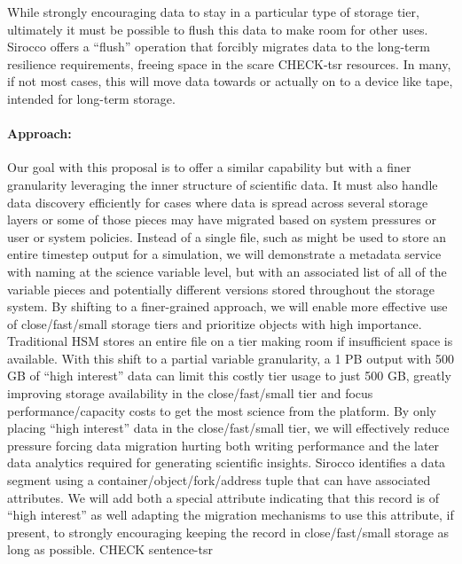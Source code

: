While strongly encouraging data to stay in a particular type of storage tier,
ultimately it must be possible to flush this data to make room for other uses.
Sirocco offers a ``flush'' operation that forcibly migrates data to the
long-term resilience requirements, freeing space in the {\color{red}scare CHECK-tsr} resources. In
many, if not most cases, this will move data towards or actually on to a device
like tape, intended for long-term storage.

\paragraph{Approach:}
Our goal with this proposal is to offer a similar capability but with a finer
granularity leveraging the inner structure of scientific data. It must also
handle data discovery efficiently for cases where data is spread across several
storage layers or some of those pieces may have migrated based on system
pressures or user or system policies. Instead of a single file, such as might
be used to store an entire timestep output for a simulation, we will
demonstrate a metadata service with naming at the science variable level, but
with an associated list of all of the variable pieces and potentially different
versions stored throughout the storage system. By shifting to a finer-grained
approach, we will enable more effective use of close/fast/small storage tiers
and prioritize objects with high importance.  Traditional HSM stores an entire
file on a tier making room if insufficient space is available.  With this shift
to a partial variable granularity, a 1 PB output with 500 GB of ``high
interest'' data can limit this costly tier usage to just 500 GB, greatly
improving storage availability in the close/fast/small tier and focus
performance/capacity costs to get the most science from the platform.  By
only placing ``high interest'' data in the close/fast/small tier, we will
effectively reduce pressure forcing data migration hurting both writing
performance and the later data analytics required for generating scientific
insights.  Sirocco identifies a data segment using a
container/object/fork/address tuple that can have associated attributes. {\color{red}We will
add both a special attribute indicating that this record is of ``high
interest'' as well adapting the migration mechanisms to use this attribute, if
present, to strongly encouraging keeping the record in close/fast/small storage
as long as possible. CHECK sentence-tsr}


